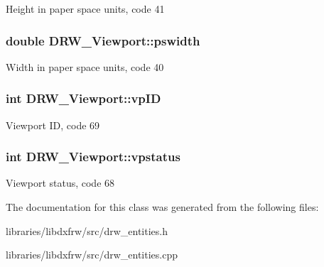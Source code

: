 Height in paper space units, code 41 \hypertarget{classDRW__Viewport_a3d0d03d4fc2c8a3edb3f1ad6e2cdcf2e}{
\subsubsection[{pswidth}]{\setlength{\rightskip}{0pt plus 5cm}double D\-R\-W\-\_\-\-Viewport\-::pswidth}}\label{classDRW__Viewport_a3d0d03d4fc2c8a3edb3f1ad6e2cdcf2e}
Width in paper space units, code 40 \hypertarget{classDRW__Viewport_adbec007a8c4b56acd1a55238aca29250}{
\subsubsection[{vp\-I\-D}]{\setlength{\rightskip}{0pt plus 5cm}int D\-R\-W\-\_\-\-Viewport\-::vp\-I\-D}}\label{classDRW__Viewport_adbec007a8c4b56acd1a55238aca29250}
Viewport I\-D, code 69 \hypertarget{classDRW__Viewport_a5d894c4b220ebb89e7b2f368a02c6a65}{
\subsubsection[{vpstatus}]{\setlength{\rightskip}{0pt plus 5cm}int D\-R\-W\-\_\-\-Viewport\-::vpstatus}}\label{classDRW__Viewport_a5d894c4b220ebb89e7b2f368a02c6a65}
Viewport status, code 68 

The documentation for this class was generated from the following files\-:\begin{DoxyCompactItemize}
\item 
libraries/libdxfrw/src/drw\-\_\-entities.\-h\item 
libraries/libdxfrw/src/drw\-\_\-entities.\-cpp\end{DoxyCompactItemize}
